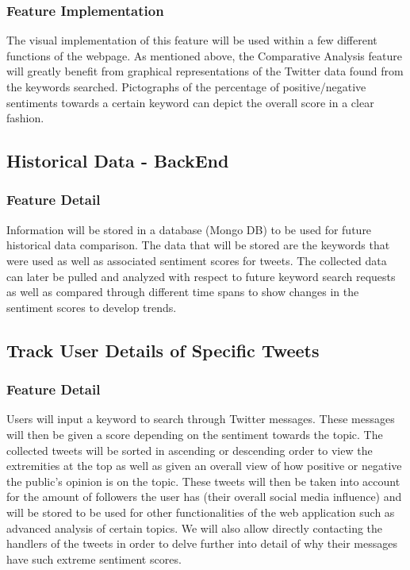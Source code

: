 \documentclass[12pt, titlepage]{article}
\begin{document}
\subsubsection{Feature Implementation}
The visual implementation of this feature will be used within a few different functions of the webpage. As mentioned above, the Comparative Analysis feature will greatly benefit from graphical representations of the Twitter data found from the keywords searched. Pictographs of the percentage of positive/negative sentiments towards a certain keyword can depict the overall score in a clear fashion.

\subsection{Historical Data - BackEnd}
\subsubsection{Feature Detail}
Information will be stored in a database (Mongo DB) to be used for future historical data comparison. The data that will be stored are the keywords that were used as well as associated sentiment scores for tweets. The collected data can later be pulled and analyzed with respect to future keyword search requests as well as compared through different time spans to show changes in the sentiment scores to develop trends. 

\subsection{Track User Details of Specific Tweets}
\subsubsection{Feature Detail}
Users will input a keyword to search through Twitter messages. These messages will then be given a score depending on the sentiment towards the topic. The collected tweets will be sorted in ascending or descending order to view the extremities at the top as well as given an overall view of how positive or negative the public’s opinion is on the topic. These tweets will then be taken into account for the amount of followers the user has (their overall social media influence) and will be stored to be used for other functionalities of the web application such as advanced analysis of certain topics. We will also allow directly contacting the handlers of the tweets in order to delve further into detail of why their messages have such extreme sentiment scores.
\end{document}

